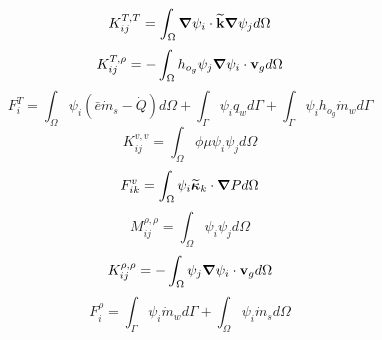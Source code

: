 \begin{equation}
  K^{T,T}_{ij} = \int_{\Omega} {\boldsymbol{\nabla}} {\psi_{i}} \cdot \widetilde{\textbf{k}} {\boldsymbol{\nabla}} {\psi_{j}} d \Omega
\end{equation}
\begin{equation}
  K^{T,\rho}_{ij} = - \int_{\Omega} h_{o_{g}} \psi_{j} {\boldsymbol{\nabla}} {\psi_{i}} \cdot \mathbf{v}_{g} d \Omega
\end{equation}
\begin{equation}
  F^{T}_{i} = \int_{\Omega} \psi_{i} \left(\bar{e} \dot{m}_{s} - \dot{Q} \right) d \Omega + \int_{\Gamma} \psi_{i} q_{w} d \Gamma + \int_{\Gamma} \psi_{i} h_{o_{g}} \dot{m}_{w} d \Gamma
  \label{eq:energy_bc}
\end{equation}
\begin{equation}
  K^{v,v}_{ij} = \int_{\Omega} \phi\mu\psi_{i} \psi_{j} d \Omega
\end{equation}
\begin{equation}
  F^{v}_{ik} = \int_{\Omega} \psi_{i} \widetilde{\boldsymbol{\kappa}}_{k} \cdot {\boldsymbol{\nabla}} {P} d \Omega
\end{equation}
\begin{equation}
  M^{\rho,\rho}_{ij} = \int_{\Omega} \psi_{i} \psi_{j} d \Omega
\end{equation}
\begin{equation}
   K^{\rho,\rho}_{ij} = - \int_{\Omega} \psi_{j} {\boldsymbol{\nabla}} {\psi_{i}} \cdot \mathbf{v}_g d \Omega 
\end{equation}
\begin{equation}
  F^{\rho}_{i} = \int_{\Gamma} \psi_{i} \dot{m}_{w} d \Gamma + \int_{\Omega} \psi_{i} \dot{m}_{s} d \Omega
  \label{eq:last_integral}
\end{equation}


